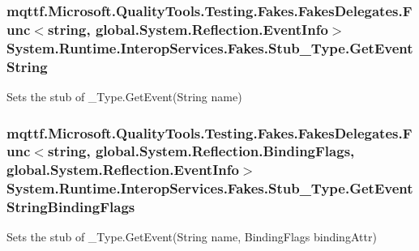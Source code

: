 \hypertarget{class_system_1_1_runtime_1_1_interop_services_1_1_fakes_1_1_stub___type_aa4f8fda88a2f9ebce9e3c8aa3fc8f2a0}{
\subsubsection[{Get\-Event\-String}]{\setlength{\rightskip}{0pt plus 5cm}mqttf.\-Microsoft.\-Quality\-Tools.\-Testing.\-Fakes.\-Fakes\-Delegates.\-Func$<$string, global.\-System.\-Reflection.\-Event\-Info$>$ System.\-Runtime.\-Interop\-Services.\-Fakes.\-Stub\-\_\-\-Type.\-Get\-Event\-String}}\label{class_system_1_1_runtime_1_1_interop_services_1_1_fakes_1_1_stub___type_aa4f8fda88a2f9ebce9e3c8aa3fc8f2a0}


Sets the stub of \-\_\-\-Type.\-Get\-Event(\-String name)

\hypertarget{class_system_1_1_runtime_1_1_interop_services_1_1_fakes_1_1_stub___type_aa41705a1228c25359f772a5c80c08940}{
\subsubsection[{Get\-Event\-String\-Binding\-Flags}]{\setlength{\rightskip}{0pt plus 5cm}mqttf.\-Microsoft.\-Quality\-Tools.\-Testing.\-Fakes.\-Fakes\-Delegates.\-Func$<$string, global.\-System.\-Reflection.\-Binding\-Flags, global.\-System.\-Reflection.\-Event\-Info$>$ System.\-Runtime.\-Interop\-Services.\-Fakes.\-Stub\-\_\-\-Type.\-Get\-Event\-String\-Binding\-Flags}}\label{class_system_1_1_runtime_1_1_interop_services_1_1_fakes_1_1_stub___type_aa41705a1228c25359f772a5c80c08940}


Sets the stub of \-\_\-\-Type.\-Get\-Event(\-String name, Binding\-Flags binding\-Attr)

